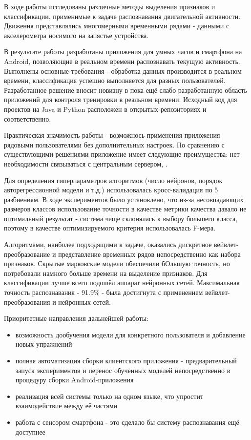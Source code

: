 \conclusion

В ходе работы исследованы различные методы выделения признаков и классификации, применимые к задаче распознавания двигательной активности. Движения представлялись многомерными временными рядами - данными с акселерометра носимого на запястье устройства.

В результате работы разработаны приложения для умных часов и смартфона на Android, позволяющие в реальном времени распознавать текущую активность. Выполнены основные требования - обработка данных производится в реальном времени, классификация успешно выполняется для разных пользователей. Разработанное решение вносит новизну в пока ещё слабо разработанную область приложений для контроля тренировки в реальном времени. Исходный код для проектов на Java и Python расположен в открытых репозиториях \cite{repo_java} и \cite{repo_python} соответственно.

Практическая значимость работы - возможнось применения приложения рядовыми пользователями без дополнительных настроек. По сравнению с существующими решениями приложение имеет следующие преимущества: нет необходимости связываться с центральным сервером, .

Для определения гиперпараметров алгоритмов (число нейронов, порядок авторегрессионной модели и т.д.) использовалась кросс-валидация по 5 разбиениям. В ходе экспериментов было установлено, что из-за несовпадающих размеров классов использование точности в качестве метрики качества давало не оптимальный результат - система чаще склонялась к выбору большего класса, поэтому в качестве оптимизируемого критерия использовалась F-мера.

Алгоритмами, наиболее подходящими к задаче, оказались дискретное вейвлет-преобразование и представление временных рядов непосредственно как набора признаков. Скрытые марковские модели обеспечили бОльшую точность, но потребовали намного больше времени на выделение признаков. Для классификации лучше всего подошёл аппарат нейронных сетей. Максимальная точность распознавания - 91.9\% - была достигнута с применением вейвлет-преобразования и нейронных сетей.

Приоритетные направления дальнейшей работы: 

\begin{itemize}
\item возможность дообучения модели для конкретного пользователя и добавление новых упражнений
\item полная автоматизация сборки клиентского приложения - предварительный запуск экспериментов и перенос обученных моделей непосредственно в процедуру сборки Android-приложения
\item реализация всей системы только на одном языке, что упростит взаимодействие между её частями
\item работа с сенсором смартфона - это сделало бы систему распознавания ещё доступнее
\end{itemize}

